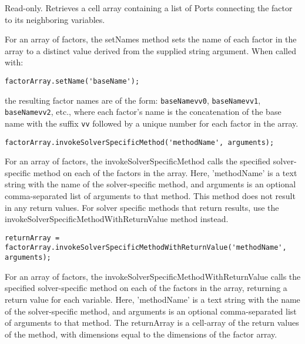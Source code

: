 
Read-only.  Retrieves a cell array containing a list of Ports connecting the factor to its neighboring variables.



\label{sec:Factor.setNames}

For an array of factors, the setNames method sets the name of each factor in the array to a distinct value derived from the supplied string argument.  When called with:

\begin{lstlisting}
factorArray.setName('baseName');
\end{lstlisting}

the resulting factor names are of the form: \texttt{baseName\textunderscore vv0}, \texttt{baseName\textunderscore vv1}, \texttt{baseName\textunderscore vv2}, etc., where each factor's name is the concatenation of the base name with the suffix \texttt{\textunderscore vv} followed by a unique number for each factor in the array.



\begin{lstlisting}
factorArray.invokeSolverSpecificMethod('methodName', arguments);
\end{lstlisting}

For an array of factors, the invokeSolverSpecificMethod calls the specified solver-specific method on each of the factors in the array.  Here, 'methodName' is a text string with the name of the solver-specific method, and arguments is an optional comma-separated list of arguments to that method.  This method does not result in any return values.  For solver specific methods that return results, use the invokeSolverSpecificMethodWithReturnValue method instead.



\begin{lstlisting}
returnArray = factorArray.invokeSolverSpecificMethodWithReturnValue('methodName', arguments);
\end{lstlisting}

For an array of factors, the invokeSolverSpecificMethodWithReturnValue calls the specified solver-specific method on each of the factors in the array, returning a return value for each variable.  Here, 'methodName' is a text string with the name of the solver-specific method, and arguments is an optional comma-separated list of arguments to that method.  The returnArray is a cell-array of the return values of the method, with dimensions equal to the dimensions of the factor array.




